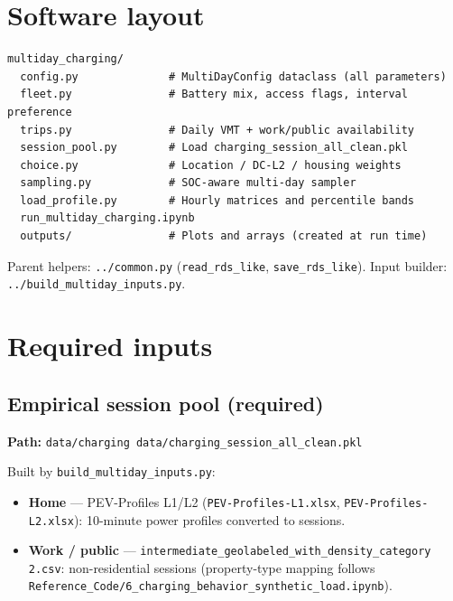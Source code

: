 \documentclass[11pt,a4paper]{article}
\begin{document}
\section{Software layout}

\begin{lstlisting}
multiday_charging/
  config.py              # MultiDayConfig dataclass (all parameters)
  fleet.py               # Battery mix, access flags, interval preference
  trips.py               # Daily VMT + work/public availability
  session_pool.py        # Load charging_session_all_clean.pkl
  choice.py              # Location / DC-L2 / housing weights
  sampling.py            # SOC-aware multi-day sampler
  load_profile.py        # Hourly matrices and percentile bands
  run_multiday_charging.ipynb
  outputs/               # Plots and arrays (created at run time)
\end{lstlisting}

Parent helpers: \texttt{../common.py} (\texttt{read\_rds\_like}, \texttt{save\_rds\_like}). Input builder: \texttt{../build\_multiday\_inputs.py}.

\section{Required inputs}

\subsection{Empirical session pool (required)}
\textbf{Path:} \texttt{data/charging data/charging\_session\_all\_clean.pkl}

Built by \texttt{build\_multiday\_inputs.py}:
\begin{itemize}[noitemsep]
  \item \textbf{Home} --- PEV-Profiles L1/L2 (\texttt{PEV-Profiles-L1.xlsx}, \texttt{PEV-Profiles-L2.xlsx}): 10-minute power profiles converted to sessions.
  \item \textbf{Work / public} --- \texttt{intermediate\_geolabeled\_with\_density\_category 2.csv}: non-residential sessions (property-type mapping follows \texttt{Reference\_Code/6\_charging\_behavior\_synthetic\_load.ipynb}).
\end{itemize}
\end{document}
